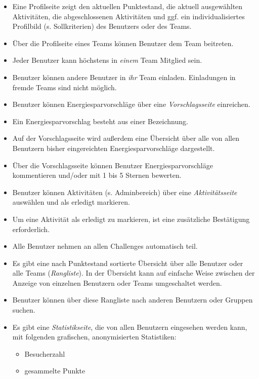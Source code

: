 \documentclass[10pt,a4paper]{article}
\begin{document}
\begin{itemize}
\begin{itemize}
                        \item Eine Profilseite zeigt den aktuellen Punktestand, die aktuell ausgewählten Aktivitäten, die abgeschlossenen Aktivitäten und ggf. ein individualisiertes Profilbild (s. Sollkriterien) des Benutzers oder des Teams.
                        \item Über die Profilseite eines Teams können Benutzer dem Team beitreten.
                        \item Jeder Benutzer kann höchstens in \emph{einem} Team Mitglied sein.
                        \item Benutzer können andere Benutzer in \emph{ihr} Team einladen. Einladungen in fremde Teams sind nicht möglich.
			\item Benutzer können Energiesparvorschläge über eine \emph{Vorschlagsseite} einreichen.
                        \item Ein Energiesparvorschlag besteht aus einer Bezeichnung.
                        \item Auf der Vorschlagsseite wird außerdem eine Übersicht über alle von allen Benutzern bisher eingereichten Energiesparvorschläge dargestellt.
                        \item Über die Vorschlagsseite können Benutzer Energiesparvorschläge kommentieren und/oder mit 1 bis 5 Sternen bewerten.
			\item Benutzer können Aktivitäten (s. Adminbereich) über eine \emph{Aktivitätsseite} auswählen und als erledigt markieren.
                        \item Um eine Aktivität als erledigt zu markieren, ist eine zusätzliche Bestätigung erforderlich.
			\item Alle Benutzer nehmen an allen Challenges automatisch teil.
			\item Es gibt eine nach Punktestand sortierte Übersicht über alle Benutzer oder alle Teams (\emph{Rangliste}). In der Übersicht kann auf einfache Weise zwischen der Anzeige von einzelnen Benutzern oder Teams umgeschaltet werden.
                        \item Benutzer können über diese Rangliste nach anderen Benutzern oder Gruppen suchen.
			\item Es gibt eine \emph{Statistikseite}, die von allen Benutzern eingesehen werden kann, mit folgenden grafischen, anonymisierten Statistiken:
			\begin{itemize}
				\item Besucherzahl
				\item gesammelte Punkte

\end{itemize}
\end{itemize}
\end{itemize}
\end{document}

